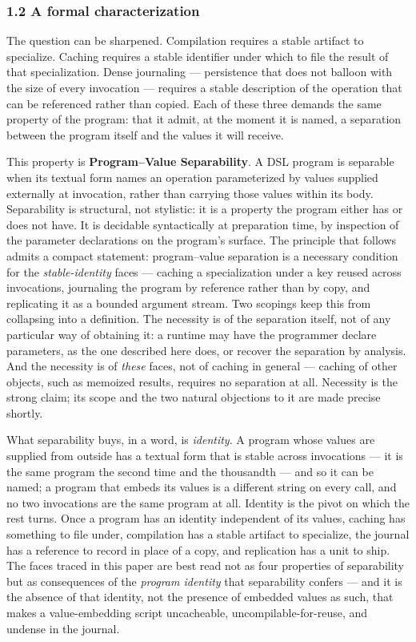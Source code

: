 \documentclass[
]{article}
\begin{document}
\subsubsection{1.2 A formal
characterization}\label{a-formal-characterization}

The question can be sharpened. Compilation requires a stable artifact to
specialize. Caching requires a stable identifier under which to file the
result of that specialization. Dense journaling --- persistence that
does not balloon with the size of every invocation --- requires a stable
description of the operation that can be referenced rather than copied.
Each of these three demands the same property of the program: that it
admit, at the moment it is named, a separation between the program
itself and the values it will receive.

This property is \textbf{Program--Value Separability}. A DSL program is
separable when its textual form names an operation parameterized by
values supplied externally at invocation, rather than carrying those
values within its body. Separability is structural, not stylistic: it is
a property the program either has or does not have. It is decidable
syntactically at preparation time, by inspection of the parameter
declarations on the program's surface. The principle that follows admits
a compact statement: program--value separation is a necessary condition
for the \emph{stable-identity} faces --- caching a specialization under
a key reused across invocations, journaling the program by reference
rather than by copy, and replicating it as a bounded argument stream.
Two scopings keep this from collapsing into a definition. The necessity
is of the separation itself, not of any particular way of obtaining it:
a runtime may have the programmer declare parameters, as the one
described here does, or recover the separation by analysis. And the
necessity is of \emph{these} faces, not of caching in general ---
caching of other objects, such as memoized results, requires no
separation at all. Necessity is the strong claim; its scope and the two
natural objections to it are made precise shortly.

What separability buys, in a word, is \emph{identity}. A program whose
values are supplied from outside has a textual form that is stable
across invocations --- it is the same program the second time and the
thousandth --- and so it can be named; a program that embeds its values
is a different string on every call, and no two invocations are the same
program at all. Identity is the pivot on which the rest turns. Once a
program has an identity independent of its values, caching has something
to file under, compilation has a stable artifact to specialize, the
journal has a reference to record in place of a copy, and replication
has a unit to ship. The faces traced in this paper are best read not as
four properties of separability but as consequences of the \emph{program
identity} that separability confers --- and it is the absence of that
identity, not the presence of embedded values as such, that makes a
value-embedding script uncacheable, uncompilable-for-reuse, and undense
in the journal.
\end{document}
